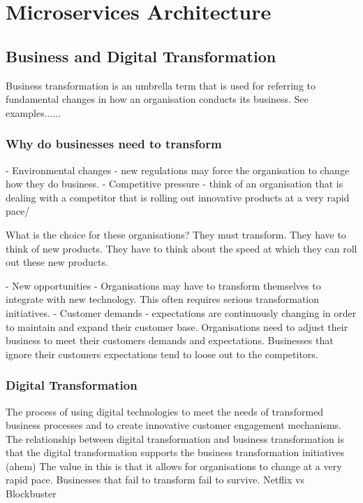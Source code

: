 
\chapter{Microservices Architecture}

\section{Business and Digital Transformation}
Business transformation is an umbrella term that is used for referring to fundamental changes in how an organisation conducts its business.
See examples......

\subsection{Why do businesses need to transform}
- Environmental changes - new regulations may force the organisation to change how they do business.
- Competitive pressure - think of an organisation that is dealing with a competitor that is rolling out innovative products at a very rapid pace/

What is the choice for these organisations?
They must transform.
They have to think of new products.
They have to think about the speed at which they can roll out these new products.

- New opportunities - Organisations may have to transform themselves to integrate with new technology.
This often requires serious transformation initiatives.
- Customer demands - expectations are continuously changing in order to maintain and expand their customer base.
Organisations need to adjust their business to meet their customers demands and expectations.
Businesses that ignore their customers expectations tend to loose out to the competitors.

\subsection{Digital Transformation}
The process of using digital technologies to meet the needs of transformed business processes and to create innovative customer engagement mechanisms.
The relationship between digital transformation and business transformation is that the digital transformation supports the business transformation initiatives (ahem)
The value in this is that it allows for organisations to change at a very rapid pace.
Businesses that fail to transform fail to survive.
Netflix vs Blockbuster

